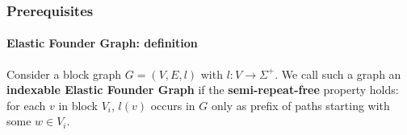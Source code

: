 \begin{frame}
	\frametitle{Prerequisites}
	\framesubtitle{Elastic Founder Graph: definition}
	\begin{definition}
		Consider a block graph \(G = (V, E, l)\) with \(l: V \rightarrow \Sigma^+\). We call such a graph
		an \textbf{indexable Elastic Founder Graph} if the \textbf{semi-repeat-free} property holds: for each
		\(v\) in block \(V_i\), \(l(v)\) occurs in \(G\) only as prefix of paths starting with some
		\(w \in V_i\).
	\end{definition}
\end{frame}